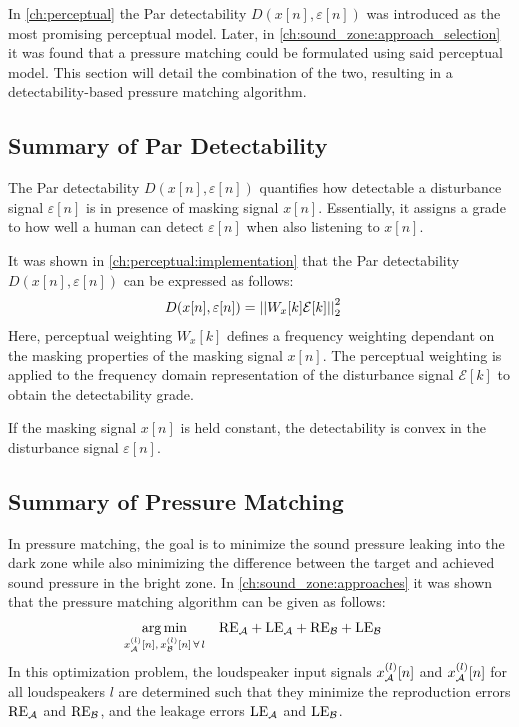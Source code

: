 In \autoref{ch:perceptual} the Par detectability $D(x[n],\varepsilon[n])$ was introduced as the most promising perceptual model.
Later, in \autoref{ch:sound_zone:approach_selection} it was found that a pressure matching could be formulated using said perceptual model.
This section will detail the combination of the two, resulting in a detectability-based pressure matching algorithm.

\subsection{Summary of Par Detectability}
The Par detectability $D(x[n],\varepsilon[n])$ quantifies how detectable a disturbance signal $\varepsilon[n]$ is in presence of masking signal $x[n]$.
Essentially, it assigns a grade to how well a human can detect $\varepsilon[n]$ when also listening to $x[n]$.  

It was shown in \autoref{ch:perceptual:implementation} that the Par detectability $D(x[n],\varepsilon[n])$ can be expressed as follows: 
\begin{align}
    D(x[n],\varepsilon[n]) &= \norm[2][2]{W_{x}[k]\mathcal{E}[k]} 
\end{align}
Here, perceptual weighting $W_{x}[k]$ defines a frequency weighting dependant on the masking properties of the masking signal $x[n]$.
The perceptual weighting is applied to the frequency domain representation of the disturbance signal $\mathcal{E}[k]$ to obtain the detectability grade.

If the masking signal $x[n]$ is held constant, the detectability is convex in the disturbance signal $\varepsilon[n]$.

\subsection{Summary of Pressure Matching}
In pressure matching, the goal is to minimize the sound pressure leaking into the dark zone while also minimizing the difference between the target and achieved sound pressure in the bright zone.
In \autoref{ch:sound_zone:approaches} it was shown that the pressure matching algorithm can be given as follows:
\begin{align}
    \argmin{x_\za^{(l)}[n],\,x_\zb^{(l)}[n]\,\forall\,l}{
       &\text{RE}_\za + \text{LE}_\za + \text{RE}_\zb + \text{LE}_\zb
    }
\end{align}
In this optimization problem, the loudspeaker input signals $x_{\mathcal{A}}^{(l)}[n]$ and $x_{\mathcal{A}}^{(l)}[n]$ for all loudspeakers $l$ are determined such that they minimize the 
reproduction errors $\text{RE}_{\mathcal{A}}$ and $\text{RE}_{\mathcal{B}}$, and the leakage errors $\text{LE}_{\mathcal{A}}$ and $\text{LE}_{\mathcal{B}}$.


